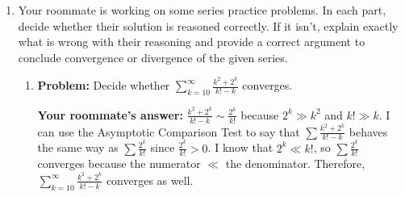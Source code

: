 \documentclass[main]{subfiles}
\begin{document}
\begin{enumerate}
\begin{enumerate}
    \begin{solution}
        The error associated to the approximation $s_{50}$ is the sum $\displaystyle \sum_{k=51}^\infty \frac{3^k}{9^k+1}$. We can upper bound that sum by the geometric series $\displaystyle \sum_{k=51}^\infty \frac{3^k}{9^k} = \sum_{k=51}^\infty \frac{1}{3^k}$ which converges to $\frac{1/3^{51}}{1- 1/3}$. Thus 
        \[\textrm{Error} \leq \frac{1}{2\cdot 3^{50}}\]
    \end{solution}

    \item 
    \begin{problem}[\vfill]
        $\displaystyle \sum_{k=1}^\infty \frac{1}{k^3}$
    \end{problem}

    \begin{solution}
        The error associated to the approximation $s_{50}$ is the sum $\displaystyle \sum_{k=51}^\infty \frac{1}{k^3}$. We can upper bound that sum by the integral $\displaystyle\int_{50}^{\infty} \frac{1}{x^3} ~dx$, which can be computed and results in $\frac{1}{2 \cdot 50^2}$. Thus,
        \[\textrm{Error} \leq \frac{1}{2 \cdot 50^2}\]
    \end{solution}
    
\end{enumerate}







\pspace{\newpage}

\item 
 Your roommate is working on some series practice problems.  In each part, decide
 whether their solution is reasoned correctly.  If it isn't, explain
 exactly what is wrong with their reasoning and provide a correct argument to conclude convergence or divergence of the given series.
 
 \begin{enumerate}
 \item
   \begin{problem}
     \textbf{Problem:} Decide whether $\displaystyle \sum_{k=10}^\infty 
     \frac{k^2 + 2^k}{k! - k}$ converges.

     \textbf{Your roommate's answer:} $\displaystyle \frac{k^2 + 2^k}{k! - k} \sim
     \frac{2^k}{k!}$ because $2^k \gg k^2$ and $k! \gg k$.  I can use the
     Asymptotic Comparison Test to say that $\displaystyle \sum \frac{k^2
       + 2^k}{k! - k}$ behaves the same way as $\displaystyle \sum
     \frac{2^k}{k!}$ since $\displaystyle \frac{2^k}{k!} > 0$.  I know
     that $2^k \ll k!$, so $\displaystyle \sum \frac{2^k}{k!}$ converges
     because the numerator $\ll$ the denominator.  Therefore,
     $\displaystyle \sum_{k=10}^\infty \frac{k^2 + 2^k}{k! - k}$
     converges as well.
   \end{problem}


\end{enumerate}
\end{enumerate}
\end{document}
